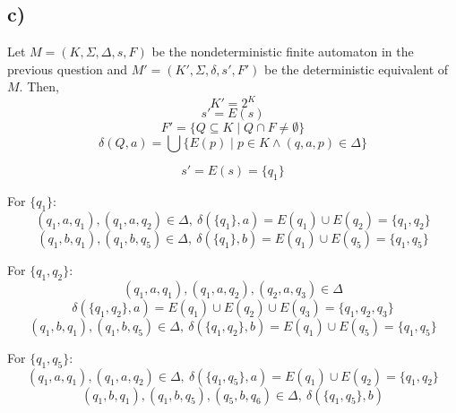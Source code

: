\documentclass[12pt]{article}
\begin{document}
\subsection*{c)}
Let $M=(K, \Sigma, \Delta, s, F)$ be the nondeterministic finite automaton in the previous question and $M'=(K', \Sigma, \delta, s', F')$ be the deterministic equivalent of $M$. Then,
\begin{equation*}
	K' = 2^K
\end{equation*}
\begin{equation*}
	s' = E(s)
\end{equation*}
\begin{equation*}
	F' = \{Q \subseteq K \mid Q \cap F \neq \emptyset\} 
\end{equation*}
\begin{equation*}
	\delta (Q,a) = \bigcup\{E(p) \mid p \in K \land (q, a, p) \in \Delta \}
\end{equation*}

\begin{equation*}
	s' = E(s) = \{q_1\}
\end{equation*}

For $\{q_1\}$:
\begin{equation*}
	(q_1, a, q_1), (q_1, a, q_2) \in \Delta, \ \delta (\{q_1\}, a) = E(q_1) \cup E(q_2) = \{q_1, q_2\}
\end{equation*}
\begin{equation*}
	(q_1, b, q_1), (q_1, b, q_5) \in \Delta, \ \delta (\{q_1\}, b) = E(q_1) \cup E(q_5) = \{q_1, q_5\}
\end{equation*}

For $\{q_1, q_2\}$:
\begin{equation*}
	(q_1, a, q_1), (q_1, a, q_2), (q_2, a, q_3) \in \Delta
\end{equation*}
\begin{equation*}
	\delta (\{q_1, q_2\}, a) = E(q_1) \cup E(q_2) \cup E(q_3) = \{q_1, q_2, q_3\}
\end{equation*}
\begin{equation*}
	(q_1, b, q_1), (q_1, b, q_5) \in \Delta, \ \delta (\{q_1, q_2\}, b) = E(q_1) \cup E(q_5) = \{q_1, q_5\}
\end{equation*}

For $\{q_1, q_5\}$:
\begin{equation*}
	(q_1, a, q_1), (q_1, a, q_2) \in \Delta, \ \delta (\{q_1, q_5\}, a) = E(q_1) \cup E(q_2) = \{q_1, q_2\}
\end{equation*}
\begin{equation*}
	(q_1, b, q_1), (q_1, b, q_5), (q_5, b, q_6) \in \Delta, \ \delta (\{q_1, q_5\}, b)
\end{equation*}
\end{document}
